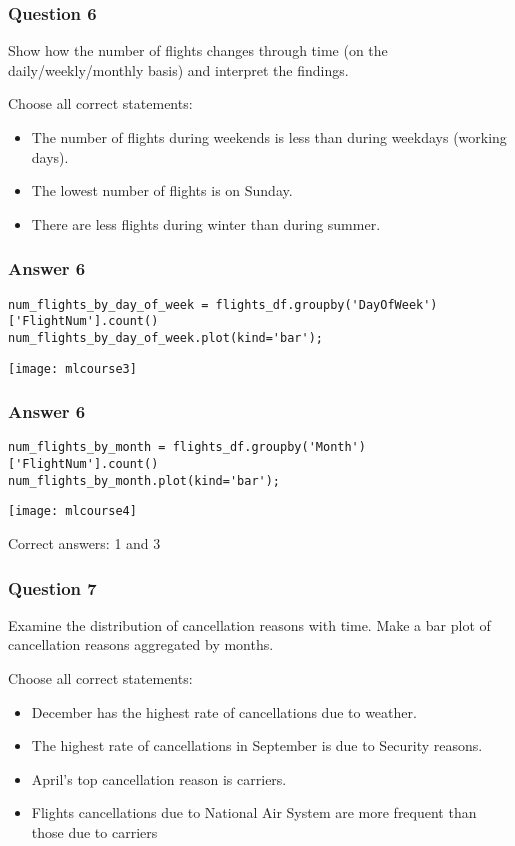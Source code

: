 \begin{frame}[fragile]\frametitle{Question 6}
Show how the number of flights changes through time (on the daily/weekly/monthly basis) and interpret the findings.

Choose all correct statements:
\begin{itemize}
\item The number of flights during weekends is less than during weekdays (working days).
\item The lowest number of flights is on Sunday.
\item There are less flights during winter than during summer.
\end{itemize}

\end{frame}

\begin{frame}[fragile]\frametitle{Answer 6}
\begin{lstlisting}
num_flights_by_day_of_week = flights_df.groupby('DayOfWeek')['FlightNum'].count()
num_flights_by_day_of_week.plot(kind='bar');
\end{lstlisting}
\begin{center}
\texttt{[image: mlcourse3]}
\end{center}
\end{frame}

\begin{frame}[fragile]\frametitle{Answer 6}
\begin{lstlisting}
num_flights_by_month = flights_df.groupby('Month')['FlightNum'].count()
num_flights_by_month.plot(kind='bar');
\end{lstlisting}
\begin{center}
\texttt{[image: mlcourse4]}
\end{center}
Correct answers: 1 and 3
\end{frame}

\begin{frame}[fragile]\frametitle{Question 7}
Examine the distribution of cancellation reasons with time. Make a bar plot of cancellation reasons aggregated by months.

Choose all correct statements:
\begin{itemize}
\item December has the highest rate of cancellations due to weather.
\item The highest rate of cancellations in September is due to Security reasons.
\item April's top cancellation reason is carriers.
\item Flights cancellations due to National Air System are more frequent than those due to carriers
\end{itemize}

\end{frame}

